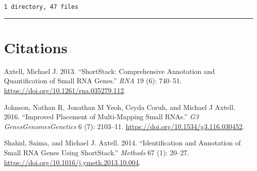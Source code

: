 \documentclass[
]{article}
\newlength{\cslhangindent}
\newlength{\cslentryspacingunit} %
\newenvironment{CSLReferences}[2] %
 {%
  \setlength{\parindent}{0pt}
  \ifodd #1
  \let\oldpar\par
  \def\par{\hangindent=\cslhangindent\oldpar}
  \fi
  \setlength{\parskip}{#2\cslentryspacingunit}
 }%
 {}
\begin{document}
\begin{verbatim}
1 directory, 47 files
\end{verbatim}

\begin{center}\rule{0.5\linewidth}{0.5pt}\end{center}

\hypertarget{citations}{%
\section*{Citations}\label{citations}}

\hypertarget{refs}{}
\begin{CSLReferences}{1}{0}
\leavevmode{}%
Axtell, Michael J. 2013. {``ShortStack: Comprehensive Annotation and Quantification of Small RNA Genes.''} \emph{RNA} 19 (6): 740--51. \url{https://doi.org/10.1261/rna.035279.112}.

\leavevmode{}%
Johnson, Nathan R, Jonathan M Yeoh, Ceyda Coruh, and Michael J Axtell. 2016. {``Improved Placement of Multi-Mapping Small RNAs.''} \emph{G3 Genes\textbar Genomes\textbar Genetics} 6 (7): 2103--11. \url{https://doi.org/10.1534/g3.116.030452}.

\leavevmode{}%
Shahid, Saima, and Michael J. Axtell. 2014. {``Identification and Annotation of Small RNA Genes Using ShortStack.''} \emph{Methods} 67 (1): 20--27. \url{https://doi.org/10.1016/j.ymeth.2013.10.004}.

\end{CSLReferences}
\end{document}
